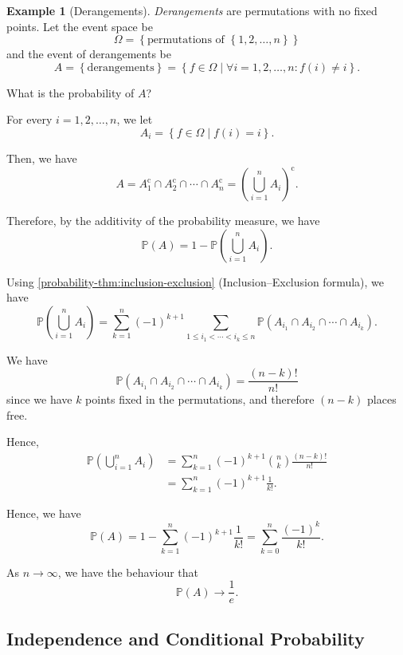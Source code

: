 \documentclass[11pt]{article}
\numberwithin{equation}{section}
\theoremstyle{definition}
\newtheorem{example}[theorem]{Example}
\theoremstyle{remark}
\newcommand{\pqty}[1]{\left(#1\right)}
\newcommand{\Bqty}[1]{\left\{#1\right\}}
\newcommand{\set}[2]{\left\{#1\mid #2\right\}}
\newcommand{\compl}{^{\mathrm c}}
\newcommand{\Prob}{\mathbb P}
\begin{document}
\begin{example}[Derangements]\label{probability-example-008}
    \label{probability-ex:derangements}%
    \emph{Derangements} are permutations with no fixed points. Let the event space be
    \[
        \Omega = \Bqty{\text{permutations of }\Bqty{1, 2, \ldots, n}}
    \]
    and the event of derangements be
    \[
        A = \Bqty{\text{derangements}} = \set{f \in \Omega}{\forall i = 1, 2, \ldots, n: f\pqty{i} \neq i}.
    \]

    What is the probability of \(A\)?

    For every \(i = 1, 2, \ldots, n\), we let
    \[
        A_i = \set{f \in \Omega}{f\pqty{i} = i}.
    \]

    Then, we have
    \[
        A = A_1\compl \cap A_2\compl \cap \cdots \cap A_n\compl = \pqty{\bigcup_{i = 1}^{n} A_i} \compl.
    \]

    Therefore, by the additivity of the probability measure, we have
    \[
        \Prob\pqty{A} = 1 - \Prob\pqty{\bigcup_{i = 1}^{n} A_i}.
    \]

    Using \autoref{probability-thm:inclusion-exclusion} (Inclusion--Exclusion formula), we have
    \[
        \Prob\pqty{\bigcup_{i = 1}^{n} A_i} = \sum_{k = 1}^{n} \pqty{-1}^{k + 1} \sum_{1 \leq i_1 < \cdots < i_k \leq n} \Prob\pqty{A_{i_1} \cap A_{i_2} \cap \cdots \cap A_{i_k}}.
    \]

    We have
    \[
        \Prob\pqty{A_{i_1} \cap A_{i_2} \cap \cdots \cap A_{i_k}} = \frac{\pqty{n - k}!}{n!}
    \]
    since we have \(k\) points fixed in the permutations, and therefore \(\pqty{n - k}\) places free.
    
    Hence,
    \begin{align*}
        \Prob\pqty{\bigcup_{i = 1}^{n} A_i} &= \sum_{k = 1}^{n} \pqty{-1}^{k + 1} \binom{n}{k} \frac{\pqty{n - k}!}{n!} \\
        &= \sum_{k = 1}^{n} \pqty{-1}^{k + 1} \frac{1}{k!}.
    \end{align*}

    Hence, we have
    \[
        \Prob\pqty{A} = 1 - \sum_{k = 1}^{n} \pqty{-1}^{k + 1} \frac{1}{k!} = \sum_{k = 0}^{n} \frac{\pqty{-1}^{k}}{k!}.
    \]

    As \(n \to \infty\), we have the behaviour that
    \[
        \Prob\pqty{A} \to \frac{1}{e}.
    \]
\end{example}

\subsection{Independence and Conditional Probability}
\end{document}
